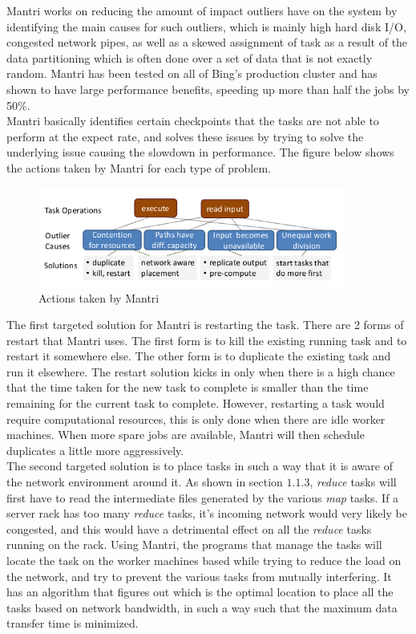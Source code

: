 \documentclass[]{article}
\begin{document}
Mantri works on reducing the amount of impact outliers have on the system by identifying the main causes for such outliers, which is mainly high hard disk I/O, congested network pipes, as well as a skewed assignment of task as a result of the data partitioning which is often done over a set of data that is not exactly random. Mantri has been tested on all of Bing's production cluster and has shown to have large performance benefits, speeding up more than half the jobs by 50\%. \\

Mantri basically identifies certain checkpoints that the tasks are not able to perform at the expect rate, and solves these issues by trying to solve the underlying issue causing the slowdown in performance. The figure below shows the actions taken by Mantri for each type of problem. \\
\begin{figure}[here]
	\begin{center}
		\includegraphics[width=0.9\textwidth]{mantri11.png}
		\caption{Actions taken by Mantri}
		\label{fig:mantri11}
	\end{center}
\end{figure}

The first targeted solution for Mantri is restarting the task. There are 2 forms of restart that Mantri uses. The first form is to kill the existing running task and to restart it somewhere else. The other form is to duplicate the existing task and run it elsewhere. The restart solution kicks in only when there is a high chance that the time taken for the new task to complete is smaller than the time remaining for the current task to complete. However, restarting a task would require computational resources, this is only done when there are idle worker machines. When more spare jobs are available, Mantri will then schedule duplicates a little more aggressively.\\

The second targeted solution is to place tasks in such a way that it is aware of the network environment around it. As shown in section $1.1.3$, \emph{reduce} tasks will first have to read the intermediate files generated by the various \emph{map} tasks. If a server rack has too many \emph{reduce} tasks, it's incoming network would very likely be congested, and this would have a detrimental effect on all the \emph{reduce} tasks running on the rack. Using Mantri, the programs that manage the tasks will locate the task on the worker machines based while trying to reduce the load on the network, and try to prevent the various tasks from mutually interfering. It has an algorithm that figures out which is the optimal location to place all the tasks based on network bandwidth, in such a way such that the maximum data transfer time is minimized.\\
\end{document}
